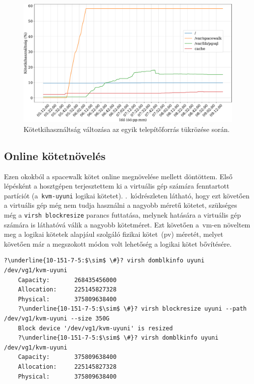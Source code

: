 \begin{figure}[ht]
	\centering
	\includegraphics[width=15cm]{figures/reposync-leap-oss-disk-grid.pdf}
	\caption{Kötetkihasználtság változása az egyik telepítőforrás tükrözése során.}
	\label{fig:reposync-disk-usage}
\end{figure}

\subsection{Online kötetnövelés}
Ezen okokból a spacewalk kötet online megnövelése mellett döntöttem. Első lépésként a hosztgépen terjesztettem ki a virtuális gép számára fenntartott partíciót (a~\texttt{kvm-uyuni} logikai kötetet). .~kódrészleten látható, hogy ezt követően a virtuális gép még nem tudja használni a nagyobb méretű kötetet, szükséges még a \texttt{virsh blockresize} parancs futtatása, melynek hatására a virtuális gép számára is láthatóvá válik a nagyobb kötetméret. Ezt követően a~\acrshort{vm}-en növeltem meg a logikai kötetek alapjául szolgáló fizikai kötet~(\acrshort{pv}) méretét, melyet követően már a megszokott módon volt lehetőség a logikai kötet bővítésére.

\begin{lstlisting}[caption=Az infrastruktúramenedzsment-programokat futtató virtuális gép kötetének online megnövelése a gazdagépen.,label=lst:virsh-blockresize,escapechar=?]
	?\underline{10-151-7-5:$\sim$ \#}? virsh domblkinfo uyuni /dev/vg1/kvm-uyuni
	Capacity:       268435456000
	Allocation:     225145827328
	Physical:       375809638400
	?\underline{10-151-7-5:$\sim$ \#}? virsh blockresize uyuni --path /dev/vg1/kvm-uyuni --size 350G
	Block device '/dev/vg1/kvm-uyuni' is resized
	?\underline{10-151-7-5:$\sim$ \#}? virsh domblkinfo uyuni /dev/vg1/kvm-uyuni
	Capacity:       375809638400
	Allocation:     225145827328
	Physical:       375809638400
\end{lstlisting}

